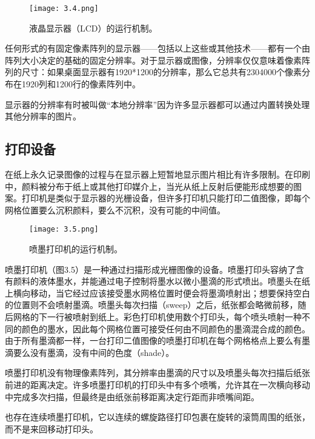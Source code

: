 \documentclass[lang=cn,12pt]{elegantbook}
\begin{document}
\begin{figure}[htb]
\centering
\texttt{[image: 3.4.png]}
\caption{液晶显示器（LCD）的运行机制。}
\end{figure}

任何形式的有固定像素阵列的显示器——包括以上这些或其他技术——都有一个由阵列大小决定的基础的固定分辨率。对于显示器或图像，分辨率仅仅意味着像素阵列的尺寸：如果桌面显示器有1920*1200的分辨率，那么它总共有2304000个像素分布在1920列和1200行的像素阵列中。

\begin{note}
显示器的分辨率有时被叫做“本地分辨率”因为许多显示器都可以通过内置转换处理其他分辨率的图片。
\end{note}

\subsection{打印设备}

在纸上永久记录图像的过程与在显示器上短暂地显示图片相比有许多限制。在印刷中，颜料被分布于纸上或其他打印媒介上，当光从纸上反射后便能形成想要的图案。打印机是类似于显示器的光栅设备，但许多打印机只能打印二值图像，即每个网格位置要么沉积颜料，要么不沉积，没有可能的中间值。

\begin{figure}[htb]
\centering
\texttt{[image: 3.5.png]}
\caption{喷墨打印机的运行机制。}
\end{figure}

喷墨打印机（图3.5）是一种通过扫描形成光栅图像的设备。喷墨打印头容纳了含有颜料的液体墨水，并能通过电子控制将墨水以微小墨滴的形式喷出。喷墨头在纸上横向移动，当它经过应该接受墨水网格位置时便会将墨滴喷射出；想要保持空白的位置则不会喷射墨滴。喷墨头每次扫描（sweep）之后，纸张都会略微前移，随后网格的下一行被喷射到纸上。彩色打印机使用数个打印头，每个喷头喷射一种不同的颜色的墨水，因此每个网格位置可接受任何由不同颜色的墨滴混合成的颜色。由于所有墨滴都一样，一台打印二值图像的喷墨打印机在每个网格格点上要么有墨滴要么没有墨滴，没有中间的色度（shade）。

喷墨打印机没有物理像素阵列，其分辨率由墨滴的尺寸以及喷墨头每次扫描后纸张前进的距离决定。许多喷墨打印机的打印头中有多个喷嘴，允许其在一次横向移动中完成多次扫描，但最终是由纸张前移距离决定行距而非喷嘴间距。

\begin{note}
也存在连续喷墨打印机，它以连续的螺旋路径打印包裹在旋转的滚筒周围的纸张，而不是来回移动打印头。
\end{note}
\end{document}
